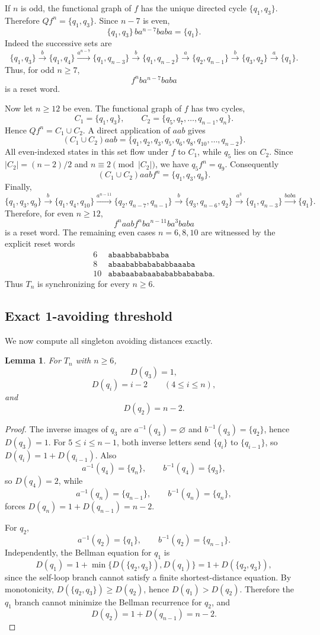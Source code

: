 \documentclass[11pt]{article}
\newtheorem{lemma}{Lemma}
\theoremstyle{definition}
\theoremstyle{remark}
\begin{document}
If $n$ is odd, the functional graph of $f$ has the unique directed cycle $\{q_1,q_3\}$. Therefore $Qf^n=\{q_1,q_3\}$. Since $n-7$ is even,
\[
\{q_1,q_3\}\,b a^{n-7} b a b a=\{q_1\}.
\]
Indeed the successive sets are
\[
\{q_1,q_3\}\xrightarrow{b}\{q_1,q_4\}
\xrightarrow{a^{n-7}}\{q_1,q_{n-3}\}
\xrightarrow{b}\{q_1,q_{n-2}\}
\xrightarrow{a}\{q_2,q_{n-1}\}
\xrightarrow{b}\{q_3,q_2\}
\xrightarrow{a}\{q_1\}.
\]
Thus, for odd $n\ge7$,
\[
 f^n b a^{n-7}baba
\]
is a reset word.

Now let $n\ge12$ be even. The functional graph of $f$ has two cycles,
\[
C_1=\{q_1,q_3\},\qquad
C_2=\{q_5,q_7,\ldots,q_{n-1},q_n\}.
\]
Hence $Qf^n=C_1\cup C_2$. A direct application of $aab$ gives
\[
(C_1\cup C_2)aab
=\{q_1,q_2,q_3,q_5,q_6,q_8,q_{10},\ldots,q_{n-2}\}.
\]
All even-indexed states in this set flow under $f$ to $C_1$, while $q_5$ lies on $C_2$. Since $|C_2|=(n-2)/2$ and $n\equiv2\pmod{|C_2|}$, we have $q_5f^n=q_9$. Consequently
\[
(C_1\cup C_2)aab f^n=\{q_1,q_3,q_9\}.
\]
Finally,
\[
\{q_1,q_3,q_9\}
\xrightarrow{b}\{q_1,q_4,q_{10}\}
\xrightarrow{a^{n-11}}\{q_2,q_{n-7},q_{n-1}\}
\xrightarrow{b}\{q_3,q_{n-6},q_2\}
\xrightarrow{a^3}\{q_1,q_{n-3}\}
\xrightarrow{baba}\{q_1\}.
\]
Therefore, for even $n\ge12$,
\[
 f^n aab f^n b a^{n-11}b a^3baba
\]
is a reset word. The remaining even cases $n=6,8,10$ are witnessed by the explicit reset words
\[
\begin{array}{c|l}
6 & \texttt{abaabbababbaba}\\
8 & \texttt{abaababbabababbaaaba}\\
10& \texttt{ababaababaabababbabababa}.
\end{array}
\]
Thus $T_n$ is synchronizing for every $n\ge6$.

\subsection{Exact 1-avoiding threshold}
We now compute all singleton avoiding distances exactly.

\begin{lemma}\label{lem:singletons}
For $T_n$ with $n\ge6$,
\[
D(q_3)=1,
\]
\[
D(q_i)=i-2\qquad(4\le i\le n),
\]
and
\[
D(q_2)=n-2.
\]
\end{lemma}
\begin{proof}
The inverse images of $q_3$ are $a^{-1}(q_3)=\varnothing$ and $b^{-1}(q_3)=\{q_2\}$, hence $D(q_3)=1$. For $5\le i\le n-1$, both inverse letters send $\{q_i\}$ to $\{q_{i-1}\}$, so $D(q_i)=1+D(q_{i-1})$. Also
\[
a^{-1}(q_4)=\{q_n\},\qquad b^{-1}(q_4)=\{q_3\},
\]
so $D(q_4)=2$, while
\[
a^{-1}(q_n)=\{q_{n-1}\},\qquad b^{-1}(q_n)=\{q_n\},
\]
forces $D(q_n)=1+D(q_{n-1})=n-2$.

For $q_2$,
\[
a^{-1}(q_2)=\{q_1\},\qquad b^{-1}(q_2)=\{q_{n-1}\}.
\]
Independently, the Bellman equation for $q_1$ is
\[
D(q_1)=1+\min\{D(\{q_2,q_3\}),D(q_1)\}
      =1+D(\{q_2,q_3\}),
\]
since the self-loop branch cannot satisfy a finite shortest-distance equation. By monotonicity, $D(\{q_2,q_3\})\ge D(q_2)$, hence $D(q_1)>D(q_2)$. Therefore the $q_1$ branch cannot minimize the Bellman recurrence for $q_2$, and
\[
D(q_2)=1+D(q_{n-1})=n-2.
\]
\end{proof}
\end{document}

